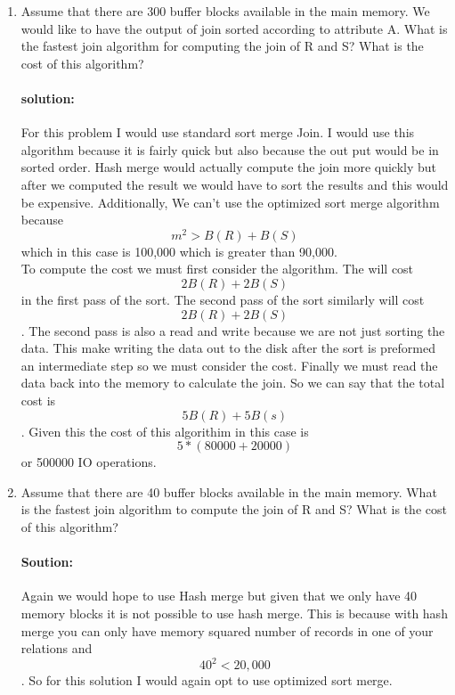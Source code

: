 \documentclass[11pt]{article}
\begin{document}
\begin{enumerate}
\item Assume that there are 300 buffer blocks available in the main memory. 
We would like to have the output of join sorted according to attribute A. 
What is the fastest join algorithm for computing the join of R and S? What is the cost of this algorithm? 

\paragraph{solution:} \hfill \break
For this problem I would use standard sort merge Join. I would use this algorithm because it is fairly quick but also because the out put would be in sorted order. Hash merge would actually compute the join more quickly but after we computed the result we would have to sort the results and this would be expensive. Additionally, We can't use the optimized sort merge algorithm because \[ m^2 > B(R) + B(S)\] which in this case is 100,000 which is greater than 90,000.\\

To compute the cost we must first consider the algorithm. The will cost \[ 2 B(R) + 2 B(S)\] in the first pass of the sort. The second pass of the sort similarly will cost \[2 B(R) + 2 B(S) \]. The second pass is also a read and write because we are not just sorting the data. This make writing the data out to the disk after the sort is preformed an intermediate step so we must consider the cost. Finally we must read the data back into the memory to calculate the join. So we can say that the total cost is \[ 5 B(R) + 5 B(s)\]. Given this the cost of this algorithim in this case is \[ 5* (80000 + 20000) \] or 500000 IO operations.\\ 


\item Assume that there are 40 buffer blocks available in the main memory. 
What is the fastest join algorithm to compute the join of R and S? What is the cost of this algorithm? \\

\paragraph{Soution:} \hfill \break
Again we would hope to use Hash merge but given that we only have 40 memory blocks it is not possible to use hash merge. This is because with hash merge you can only have memory squared number of records in one of your relations and \[40^2 < 20,000\]. So for this solution I would again opt to use optimized sort merge.\\


\end{enumerate}
\end{document}

